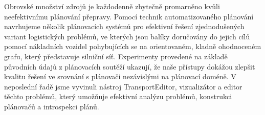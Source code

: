\documentclass[12pt,a4paper]{article}
\begin{document}
\maketitle

Obrovské množství zdrojů je každodenně zbytečně promarněno kvůli neefektivnímu plánování přepravy.
Pomocí technik automatizovaného plánování navrhujeme několik plánovacích systémů pro efektivní řešení zjednodušených variant logistických problémů,
ve kterých jsou balíky doručovány do jejich cílů
pomocí nákladních vozidel pohybujících se na orientovaném, kladně ohodnoceném grafu, který představuje silniční síť.
Experimenty provedené na základě původních údajů z plánovacích soutěží ukazují, že naše přístupy dokážou zlepšit kvalitu řešení ve srovnání s plánovači nezávislými na plánovací doméně.
V neposlední řadě jsme vyvinuli nástroj TransportEditor, vizualizátor a editor těchto problémů, který umožňuje efektivní analýzu problémů, konstrukci plánovačů a introspekci plánů.
\end{document}
